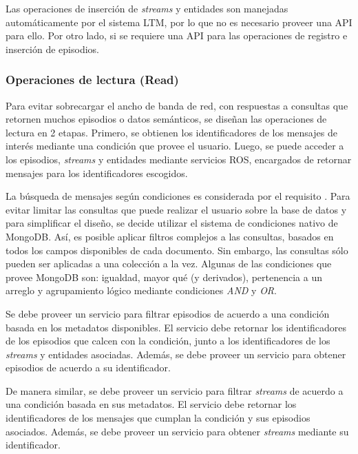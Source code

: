  Las operaciones de inserción de \textit{streams} y entidades son manejadas automáticamente por el sistema LTM, por lo que no es necesario proveer una API para ello. Por otro lado, si se requiere una API para las operaciones de registro e inserción de episodios.

\subsubsection{Operaciones de lectura (Read)}

Para evitar sobrecargar el ancho de banda de red, con respuestas a consultas que retornen muchos episodios o datos semánticos, se diseñan las operaciones de lectura en 2 etapas. Primero, se obtienen los identificadores de los mensajes de interés mediante una condición que provee el usuario. Luego, se puede acceder a los episodios, \textit{streams} y entidades mediante servicios ROS, encargados de retornar mensajes para los identificadores escogidos.

La búsqueda de mensajes según condiciones es considerada por el requisito .
Para evitar limitar las consultas que puede realizar el usuario sobre la base de datos y para simplificar el diseño, se decide utilizar el sistema de condiciones nativo de MongoDB. Así, es posible aplicar filtros complejos a las consultas, basados en todos los campos disponibles de cada documento. Sin embargo, las consultas sólo pueden ser aplicadas a una colección a la vez. Algunas de las condiciones que provee MongoDB son: igualdad, mayor qué (y derivados), pertenencia a un arreglo y agrupamiento lógico mediante condiciones \textit{AND} y \textit{OR}.

Se debe proveer un servicio para filtrar episodios de acuerdo a una condición basada en los metadatos disponibles. El servicio debe retornar los identificadores de los episodios que calcen con la condición, junto a los identificadores de los \textit{streams} y entidades asociadas. Además, se debe proveer un servicio para obtener episodios de acuerdo a su identificador.

De manera similar, se debe proveer un servicio para filtrar \textit{streams} de acuerdo a una condición basada en sus metadatos. El servicio debe retornar los identificadores de los mensajes que cumplan la condición y sus episodios asociados. Además, se debe proveer un servicio para obtener \textit{streams} mediante su identificador.

